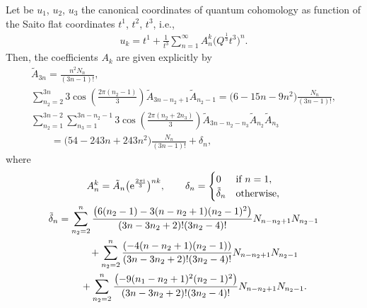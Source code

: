 \begin{Lemma}
Let be $u_1$, $u_2$, $u_3$ the canonical coordinates of quantum cohomology as function of the Saito flat coordinates $t^1$, $t^2$, $t^3$, i.e.,
\begin{gather}\label{canonical coordinates lemma appendix}
u_k=t^1+\frac{1}{t^3}\sum_{n=1}^{\infty} A_n^k \bigl( Q^{\frac{1}{3}}t^3 \bigr)^n.
\end{gather}
Then, the coefficients $A_{k}$ are given explicitly by
\begin{gather*}
\tilde A_{3n}=\frac{n^2N_n}{(3n-1)! },\\
\sum_{n_2=2}^{3n}3\cos\left( \frac{2\pi (n_2-1)}{3}\right) \tilde A_{3n-n_2+1} \tilde A_{n_2-1}=\bigl(6-15n-9n^2 \bigr)\frac{N_n}{(3n-1)!},\\
\sum_{n_2=1}^{3n-2}\sum_{n_3=1}^{3n-n_2-1}3\cos\left( \frac{2\pi (n_2+2n_3 )}{3} \right) \tilde A_{3n-n_2-n_3} \tilde A_{n_2} \tilde A_{n_3}\\
\qquad=\bigl(54-243n +243n^2\bigr)\frac{N_n}{(3n-1)!}+\delta_{n} ,
\end{gather*}
where
\begin{gather*}
A_n^k=\tilde A_n \bigl( {\rm e}^{\frac{2\pi {\rm i}}{3}}\bigr)^{nk},
\qquad
\delta_n=
\begin{cases}
0& \text{if } n=1,\\
 \tilde\delta_n & \text{otherwise},
\end{cases}
\\
\tilde\delta_n=\sum_{n_2=2}^{n}\frac{\bigl(6(n_2-1)-3(n-n_2+1)(n_2-1)^2 \bigr)}{(3n-3n_2+2)!(3n_2-4)!} N_{n-n_2+1}N_{n_2-1}\\
\phantom{\tilde\delta_n=}{}+\sum_{n_2=2}^{n}\frac{(-4(n-n_2+1)(n_2-1) )}{(3n-3n_2+2)!(3n_2-4)!} N_{n-n_2+1}N_{n_2-1}\\
\phantom{\tilde\delta_n=}{}+\sum_{n_2=2}^{n}\frac{\bigl(-9(n_1-n_2+1)^2(n_2-1)^2 \bigr)}{(3n-3n_2+2)!(3n_2-4)!} N_{n-n_2+1}N_{n_2-1}.
\end{gather*}
\end{Lemma}


